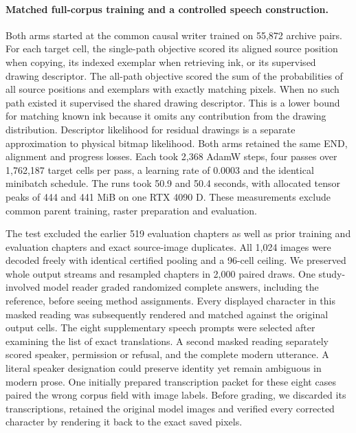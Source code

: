 \paragraph{Matched full-corpus training and a controlled speech construction.}
Both arms started at the common causal writer trained on 55,872 archive pairs. For each target cell, the single-path objective scored its aligned source position when copying, its indexed exemplar when retrieving ink, or its supervised drawing descriptor. The all-path objective scored the sum of the probabilities of all source positions and exemplars with exactly matching pixels. When no such path existed it supervised the shared drawing descriptor. This is a lower bound for matching known ink because it omits any contribution from the drawing distribution. Descriptor likelihood for residual drawings is a separate approximation to physical bitmap likelihood. Both arms retained the same END, alignment and progress losses. Each took 2,368 AdamW steps, four passes over 1,762,187 target cells per pass, a learning rate of 0.0003 and the identical minibatch schedule. The runs took 50.9 and 50.4 seconds, with allocated tensor peaks of 444 and 441 MiB on one RTX 4090 D. These measurements exclude common parent training, raster preparation and evaluation.

The test excluded the earlier 519 evaluation chapters as well as prior training and evaluation chapters and exact source-image duplicates. All 1,024 images were decoded freely with identical certified pooling and a 96-cell ceiling. We preserved whole output streams and resampled chapters in 2,000 paired draws. One study-involved model reader graded randomized complete answers, including the reference, before seeing method assignments. Every displayed character in this masked reading was subsequently rendered and matched against the original output cells. The eight supplementary speech prompts were selected after examining the list of exact translations. A second masked reading separately scored speaker, permission or refusal, and the complete modern utterance. A literal speaker designation could preserve identity yet remain ambiguous in modern prose. One initially prepared transcription packet for these eight cases paired the wrong corpus field with image labels. Before grading, we discarded its transcriptions, retained the original model images and verified every corrected character by rendering it back to the exact saved pixels.
